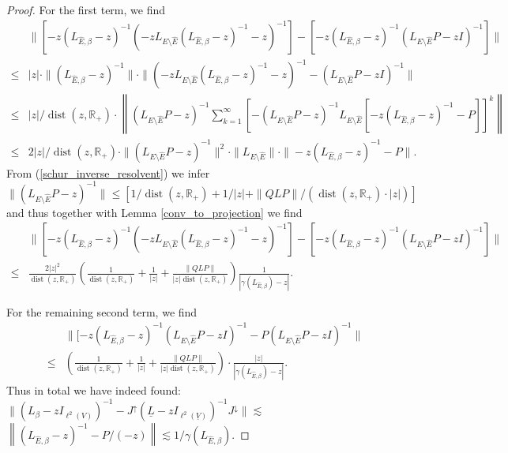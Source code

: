 \documentclass[reqno,12pt,letterpaper]{amsart}
\numberwithin{equation}{section}
\newcommand{\dist}{{\operatorname{dist}}}
\newcommand{\1}{\mathds{1}}
\theoremstyle{definition}
\begin{document}
\begin{proof}
For the first term, we find
\begin{align}
& 	\| [-z(L_{\hat{E},\beta} -z)^{-1} (-z L_{E \setminus \hat{E}} (L_{\hat{E},\beta} -z)^{-1} - z)^{-1}] -  [-z(L_{\hat{E},\beta} -z)^{-1}( L_{E \setminus \hat{E}} P - z I)^{-1} ]   \|\\
\leq & |z| \cdot \| (L_{\hat{E},\beta} -z)^{-1} \| \cdot \|
(-z L_{E \setminus \hat{E}} (L_{\hat{E},\beta} -z)^{-1} - z)^{-1} - ( L_{E \setminus \hat{E}} P - z I)^{-1} 
  \|\\
 \leq & |z| /\dist(z, \mathds{R}_+) \cdot
 \left\|(L_{E \setminus \hat{E}} P -z )^{-1} \sum\limits_{k = 1}^{\infty} [-(L_{E \setminus \hat{E}} P -z )^{-1} L_{E \setminus \hat{E}}  [-z (L_{\hat{E},\beta} -z)^{-1}- P]]^k\right\|\\
 \leq & 2|z| /\dist(z, \mathds{R}_+) \cdot \|   (L_{E \setminus \hat{E}} P -z )^{-1}     \|^2
 \cdot
 \|L_{E \setminus \hat{E}}\| \cdot \|-z (L_{\hat{E},\beta} -z)^{-1}- P\|.
\end{align}
From (\ref{schur_inverse_resolvent}) we infer $ \|   (L_{E \setminus \hat{E}} P -z )^{-1}     \| \leq [1/\dist(z, \mathds{R}_+) + 1/|z| + \|Q L P \|/(\dist(z, \mathds{R}_+) \cdot |z|) ]$ and thus together with Lemma \ref{conv_to_projection} we find
\begin{align}
	& 	\| [-z(L_{\hat{E},\beta} -z)^{-1} (-z L_{E \setminus \hat{E}} (L_{\hat{E},\beta} -z)^{-1} - z)^{-1}] -  [-z(L_{\hat{E},\beta} -z)^{-1}( L_{E \setminus \hat{E}} P - z I)^{-1} ]   \|\\
	\leq & \frac{2 |z|^2}{\dist(z, \mathds{R}_+)}  \left(\frac{1}{\dist(z, \mathds{R}_+)} + \frac{1}{|z|} + \frac{\|QLP\|}{|z| \dist(z, \mathds{R}_+)} \right) \frac{1}{|\gamma(L_{\hat{E},\beta}) - z| }.\label{undir_bounding_eq_I}
\end{align}

For the remaining second term, we find 
\begin{align}
	&\| [-z(L_{\hat{E},\beta} -z)^{-1}( L_{E \setminus \hat{E}} P - z I)^{-1}  -  P ( L_{E \setminus \hat{E}} P - z I)^{-1}    \|\\
\leq& 
\left(\frac{1}{\dist(z, \mathds{R}_+)} + \frac{1}{|z|} + \frac{\|QLP\|}{|z| \dist(z, \mathds{R}_+)} \right)
\cdot \frac{|z|}{|\gamma(L_{\hat{E},\beta}) - z| }.\label{undir_bounding_eq_II}
\end{align}
Thus in total we have indeed found:$ 
	\|(L_\beta - z I_{\ell^2(V)})^{-1} -  J^\uparrow  (\underline{L} - z I_{\ell^2(\underline{V})})^{-1} J^\downarrow\| 
\lesssim$ \\
\noindent$	\left\|( L_{\hat{E},\beta} - z)^{-1} - P/(-z) \right\|  \lesssim
	1/\gamma(L_{\hat{E}, \beta})
$.
\end{proof}
\end{document}
